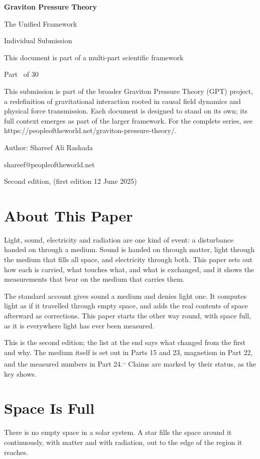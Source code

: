 \documentclass[11pt,a4paper]{article}
\makeatletter
\newcommand{\gptitle}{%
  \begin{titlepage}\centering
  \vspace*{3cm}
  {\Huge\bfseries Graviton Pressure Theory\par}\vspace{0.8cm}
  {\Large The Unified Framework\par}\vspace{0.2cm}
  {\large Individual Submission\par}\vspace{0.6cm}
  {\normalsize This document is part of a multi-part scientific framework\par}\vspace{2cm}
  {\normalsize Part \gptpart\ of 30\par}\vspace{0.8cm}
  {\huge\bfseries \gpttitle\par}\vspace{0.6cm}
  {\Large \gptsubtitle\par}\vspace{1.5cm}
  {\small\begin{minipage}{0.75\textwidth}\centering This submission is part of the broader Graviton Pressure Theory (GPT) project, a redefinition of gravitational interaction rooted in causal field dynamics and physical force transmission. Each document is designed to stand on its own; its full context emerges as part of the larger framework. For the complete series, see https://peopleoftheworld.net/graviton-pressure-theory/.\end{minipage}\par}
  \vfill
  {\large Author: Shareef Ali Rashada\par}\vspace{0.2cm}
  {\normalsize shareef@peopleoftheworld.net\par}\vspace{0.5cm}
  {\normalsize Second edition, \gptdate \quad (first edition 12 June 2025)\par}
  \end{titlepage}
  \setcounter{page}{1}\tableofcontents\clearpage}
\makeatother
\begin{document}
\gptitle

\section*{About This Paper}

Light, sound, electricity and radiation are one kind of event: a disturbance handed on through a medium. Sound is handed on through matter, light through the medium that fills all space, and electricity through both. This paper sets out how each is carried, what touches what, and what is exchanged, and it shows the measurements that bear on the medium that carries them.

The standard account gives sound a medium and denies light one. It computes light as if it travelled through empty space, and adds the real contents of space afterward as corrections. This paper starts the other way round, with space full, as it is everywhere light has ever been measured.

This is the second edition; the list at the end says what changed from the first and why. The medium itself is set out in Parts 15 and 23, magnetism in Part 22, and the measured numbers in Part 24.\textsuperscript{,}\textsuperscript{,} Claims are marked by their status, as the key shows.

\statuskey

\section{Space Is Full}

There is no empty space in a solar system. A star fills the space around it continuously, with matter and with radiation, out to the edge of the region it reaches.
\end{document}
